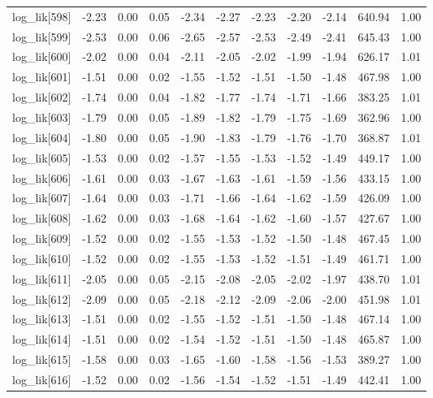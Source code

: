 \begin{table}[ht]
\begin{tabular}{rrrrrrrrrrr}
  log\_lik[598] & -2.23 & 0.00 & 0.05 & -2.34 & -2.27 & -2.23 & -2.20 & -2.14 & 640.94 & 1.00 \\ 
  log\_lik[599] & -2.53 & 0.00 & 0.06 & -2.65 & -2.57 & -2.53 & -2.49 & -2.41 & 645.43 & 1.00 \\ 
  log\_lik[600] & -2.02 & 0.00 & 0.04 & -2.11 & -2.05 & -2.02 & -1.99 & -1.94 & 626.17 & 1.01 \\ 
  log\_lik[601] & -1.51 & 0.00 & 0.02 & -1.55 & -1.52 & -1.51 & -1.50 & -1.48 & 467.98 & 1.00 \\ 
  log\_lik[602] & -1.74 & 0.00 & 0.04 & -1.82 & -1.77 & -1.74 & -1.71 & -1.66 & 383.25 & 1.01 \\ 
  log\_lik[603] & -1.79 & 0.00 & 0.05 & -1.89 & -1.82 & -1.79 & -1.75 & -1.69 & 362.96 & 1.00 \\ 
  log\_lik[604] & -1.80 & 0.00 & 0.05 & -1.90 & -1.83 & -1.79 & -1.76 & -1.70 & 368.87 & 1.01 \\ 
  log\_lik[605] & -1.53 & 0.00 & 0.02 & -1.57 & -1.55 & -1.53 & -1.52 & -1.49 & 449.17 & 1.00 \\ 
  log\_lik[606] & -1.61 & 0.00 & 0.03 & -1.67 & -1.63 & -1.61 & -1.59 & -1.56 & 433.15 & 1.00 \\ 
  log\_lik[607] & -1.64 & 0.00 & 0.03 & -1.71 & -1.66 & -1.64 & -1.62 & -1.59 & 426.09 & 1.00 \\ 
  log\_lik[608] & -1.62 & 0.00 & 0.03 & -1.68 & -1.64 & -1.62 & -1.60 & -1.57 & 427.67 & 1.00 \\ 
  log\_lik[609] & -1.52 & 0.00 & 0.02 & -1.55 & -1.53 & -1.52 & -1.50 & -1.48 & 467.45 & 1.00 \\ 
  log\_lik[610] & -1.52 & 0.00 & 0.02 & -1.55 & -1.53 & -1.52 & -1.51 & -1.49 & 461.71 & 1.00 \\ 
  log\_lik[611] & -2.05 & 0.00 & 0.05 & -2.15 & -2.08 & -2.05 & -2.02 & -1.97 & 438.70 & 1.01 \\ 
  log\_lik[612] & -2.09 & 0.00 & 0.05 & -2.18 & -2.12 & -2.09 & -2.06 & -2.00 & 451.98 & 1.01 \\ 
  log\_lik[613] & -1.51 & 0.00 & 0.02 & -1.55 & -1.52 & -1.51 & -1.50 & -1.48 & 467.14 & 1.00 \\ 
  log\_lik[614] & -1.51 & 0.00 & 0.02 & -1.54 & -1.52 & -1.51 & -1.50 & -1.48 & 465.87 & 1.00 \\ 
  log\_lik[615] & -1.58 & 0.00 & 0.03 & -1.65 & -1.60 & -1.58 & -1.56 & -1.53 & 389.27 & 1.00 \\ 
  log\_lik[616] & -1.52 & 0.00 & 0.02 & -1.56 & -1.54 & -1.52 & -1.51 & -1.49 & 442.41 & 1.00 \\ 

\end{tabular}
\end{table}
